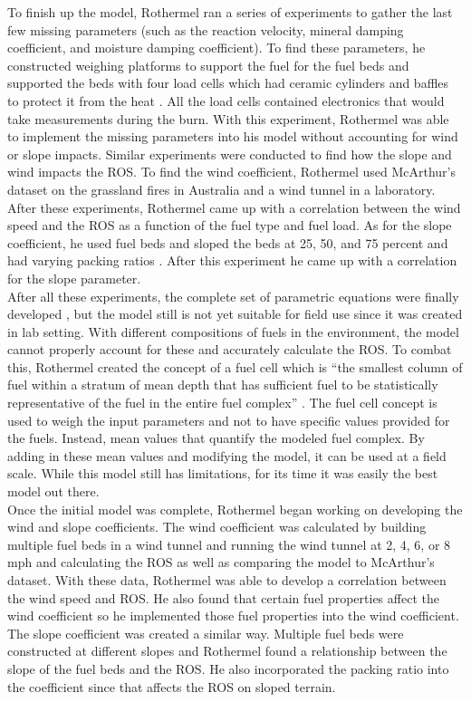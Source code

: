 \documentclass{article}
\begin{document}
\indent To finish up the model, Rothermel ran a series of experiments to gather the last few missing parameters (such as the reaction velocity, mineral damping coefficient, and moisture damping coefficient). To find these parameters, he constructed weighing platforms to support the fuel for the fuel beds and supported the beds with four load cells which had ceramic cylinders and baffles to protect it from the heat \citep{Rothermel1972}. All the load cells contained electronics that would take measurements during the burn. With this experiment, Rothermel was able to implement the missing parameters into his model without accounting for wind or slope impacts. Similar experiments were conducted to find how the slope and wind impacts the ROS. To find the wind coefficient, Rothermel used McArthur’s dataset on the grassland fires in Australia and a wind tunnel in a laboratory. After these experiments, Rothermel came up with a correlation between the wind speed and the ROS as a function of the fuel type and fuel load. As for the slope coefficient, he used fuel beds and sloped the beds at 25, 50, and 75 percent and had varying packing ratios \citep{Rothermel1972}. After this experiment he came up with a correlation for the slope parameter. \\
\indent After all these experiments, the complete set of parametric equations were finally developed \citep{Rothermel1972}, but the model still is not yet suitable for field use since it was created in lab setting. With different compositions of fuels in the environment, the model cannot properly account for these and accurately calculate the ROS. To combat this, Rothermel created the concept of a fuel cell which is “the smallest column of fuel within a stratum of mean depth that has sufficient fuel to be statistically representative of the fuel in the entire fuel complex” \citep{Rothermel1972}. The fuel cell concept is used to weigh the input parameters and not to have specific values provided for the fuels. Instead, mean values that quantify the modeled fuel complex. By adding in these mean values and modifying the model, it can be used at a field scale. While this model still has limitations, for its time it was easily the best model out there. \\ 
\indent Once the initial model was complete, Rothermel began working on developing the wind and slope coefficients. The wind coefficient was calculated by building multiple fuel beds in a wind tunnel and running the wind tunnel at 2, 4, 6, or 8 mph and calculating the ROS as well as comparing the model to McArthur's dataset. With these data, Rothermel was able to develop a correlation between the wind speed and ROS. He also found that certain fuel properties affect the wind coefficient so he implemented those fuel properties into the wind coefficient. The slope coefficient was created a similar way. Multiple fuel beds were constructed at different slopes and Rothermel found a relationship between the slope of the fuel beds and the ROS. He also incorporated the packing ratio into the coefficient since that affects the ROS on sloped terrain. 
\end{document}
